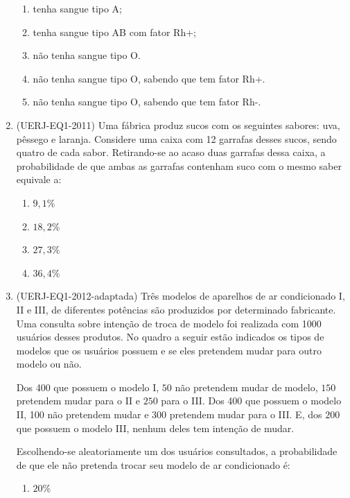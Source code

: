 \begin{enumerate}
\begin{enumerate}
\item {} 
tenha sangue tipo A;

\item {} 
tenha sangue tipo AB com fator Rh+;

\item {} 
não tenha sangue tipo O.

\item {} 
não tenha sangue tipo O, sabendo que tem fator Rh+.

\item {} 
não tenha sangue tipo O, sabendo que tem fator Rh-.

\end{enumerate}

\clearpage

\item (UERJ-EQ1-2011) Uma fábrica produz sucos com os seguintes sabores: uva, pêssego e laranja. Considere uma caixa com 12 garrafas desses sucos, sendo quatro de cada sabor. Retirando-se ao acaso duas garrafas dessa caixa, a probabilidade de que ambas as garrafas contenham suco com o mesmo saber equivale a:
\begin{enumerate}
\item {} 
$9{,}1\%$

\item {} 
$18{,}2\%$

\item {} 
$27{,}3\%$

\item {} 
$36{,}4\%$

\end{enumerate}

\item (UERJ-EQ1-2012-adaptada) Três modelos de aparelhos de ar condicionado I, II e III, de diferentes potências são produzidos por determinado fabricante. Uma consulta sobre intenção de troca de modelo foi realizada com 1000 usuários desses produtos. No quadro a seguir estão indicados os tipos de modelos que os usuários possuem e se eles pretendem mudar para outro modelo ou não.

Dos 400 que possuem o modelo I, $50$ não pretendem mudar de modelo, $150$ pretendem mudar para o II e $250$ para o III. Dos 400 que possuem o modelo II, 100 não pretendem mudar e $300$ pretendem mudar para o III. E, dos $200$ que possuem o modelo III, nenhum deles tem intenção de mudar.

Escolhendo-se aleatoriamente um dos usuários consultados, a probabilidade de que ele não pretenda trocar seu modelo de ar condicionado é:
\begin{enumerate}
\item {} 
$20\%$


\end{enumerate}
\end{enumerate}
